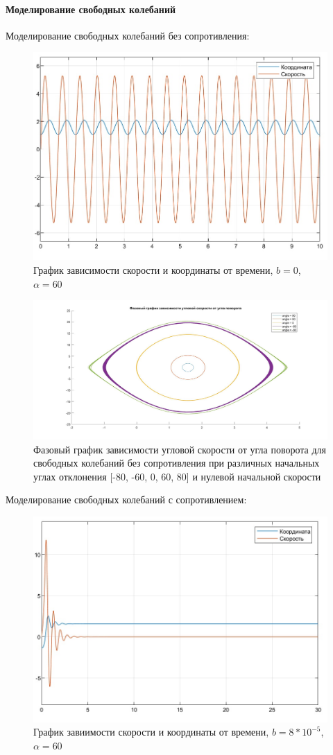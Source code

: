 \documentclass{article}
\begin{document}
	\paragraph{Моделирование свободных колебаний\\}
	Моделирование свободных колебаний без сопротивления:
	\begin{figure}[H]
		\centering
		\includegraphics[width=0.7\linewidth]{coord1}
		\caption{График зависимости скорости и координаты от времени, $b = 0$, $\alpha = 60$}
		\label{fig:coord1}
	\end{figure}
	\begin{figure}[H]
		\centering
		\includegraphics[width=1.2\linewidth]{phase1}
		\caption{Фазовый график зависимости угловой скорости от угла поворота для свободных колебаний без сопротивления при различных начальных углах отклонения [-80, -60, 0, 60, 80] и нулевой начальной скорости}
		\label{fig:phase1}
	\end{figure}
	Моделирование свободных колебаний с сопротивлением:
	\begin{figure}[H]
		\centering
		\includegraphics[width=0.7\linewidth]{coord2}
		\caption{График завиимости скорости и координаты от времени, $b = 8*10^{-5}$, $\alpha = 60$}
		\label{fig:coord2}
	\end{figure}
\end{document}
